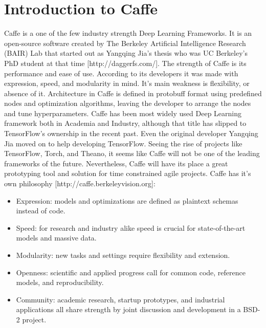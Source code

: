 \documentclass[paper=a4, fontsize=11pt]{scrartcl}
\numberwithin{equation}{section}		%
\numberwithin{figure}{section}			%
\numberwithin{table}{section}			%
\begin{document}
	\section{Introduction to Caffe}
	Caffe is a one of the few industry strength Deep Learning Frameworks. It is an open-source software created by The Berkeley Artificial Intelligence Research (BAIR) Lab that started out as Yangqing Jia's thesis who was UC Berkeley's PhD student at that time [http://daggerfs.com/]. The strength of Caffe is its performance and ease of use. According to its developers it was made with expression, speed, and modularity in mind. It's main weakness is flexibility, or absence of it. Architecture in Caffe is defined in protobuff format using predefined nodes and optimization algorithms, leaving the developer to arrange the nodes and tune hyperparameters. Caffe has been most widely used Deep Learning framework both in Academia and Industry, although that title has slipped to TensorFlow's ownership in the recent past. Even the original developer Yangqing Jia moved on to help developing TensorFlow. Seeing the rise of projects like TensorFlow, Torch, and Theano, it seems like Caffe will not be one of the leading frameworks of the future. Nevertheless, Caffe will have its place a great prototyping tool and solution for time constrained agile projects. Caffe has it's own philosophy [http://caffe.berkeleyvision.org]:
		\begin{itemize}
			\item Expression: models and optimizations are defined as plaintext schemas instead of code.
			\item Speed: for research and industry alike speed is crucial for state-of-the-art models and massive data. 
			\item Modularity: new tasks and settings require flexibility and extension.
			\item Openness: scientific and applied progress call for common code, reference models, and reproducibility.
			\item Community: academic research, startup prototypes, and industrial applications all share strength by joint discussion and development in a BSD-2 project.
		\end{itemize}
	
\end{document}
